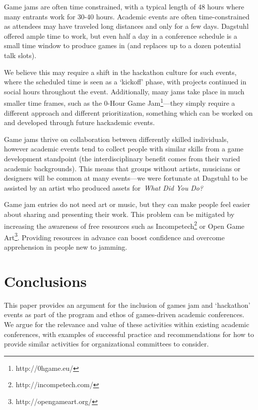 \documentclass{acm_proc_article-sp}
\newcommand{\pseudosection}[1]{\vspace{0.5\baselineskip} \noindent {\bf #1}}
\begin{document}
\pseudosection{Time Consumption.} Game jams are often time constrained, with a typical length of 48 hours where many entrants work for 30-40 hours.
Academic events are often time-constrained as attendees may have traveled long distances and only for a few days.
Dagstuhl offered ample time to work, but even half a day in a conference schedule is a small time window to produce games in (and replaces up to a dozen potential talk slots).

We believe this may require a shift in the hackathon culture for such events, where the scheduled time is seen as a `kickoff' phase, with projects continued in social hours throughout the event.
Additionally, many jams take place in much smaller time frames, such as the 0-Hour Game Jam\footnote{http://0hgame.eu/}---they simply require a different approach and different prioritization, something which can be worked on and developed through future hackademic events.

\pseudosection{Resources.} Game jams thrive on collaboration between differently skilled individuals, however academic events tend to collect people with similar skills from a game development standpoint (the interdisciplinary benefit comes from their varied academic backgrounds).
This means that groups without artists, musicians or designers will be common at many events---we were fortunate at Dagstuhl to be assisted by an artist who produced assets for~\textit{What Did You Do?}

Game jam entries do not need art or music, but they can make people feel easier about sharing and presenting their work.
This problem can be mitigated by increasing the awareness of free resources such as Incompetech\footnote{http://incompetech.com/} or Open Game Art\footnote{http://opengameart.org/}.
Providing resources in advance can boost confidence and overcome apprehension in people new to jamming.



\section{Conclusions}
This paper provides an argument for the inclusion of games jam and `hackathon' events as part of the program and ethos of games-driven academic conferences.
We argue for the relevance and value of these activities within existing academic conferences, with examples of successful practice and recommendations for how to provide similar activities for organizational committees to consider.
\end{document}

